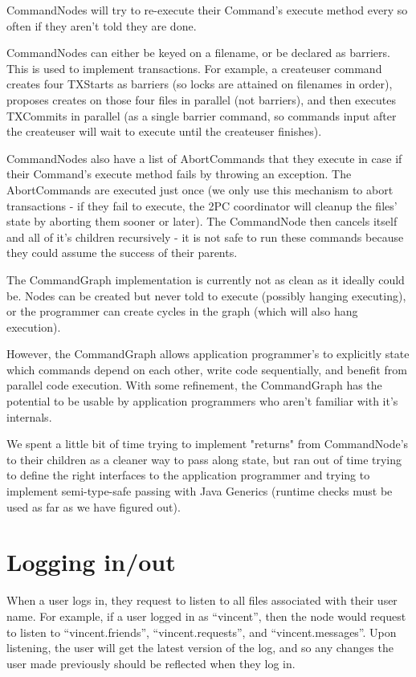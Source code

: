 \documentclass[11pt]{article}
\begin{document}
CommandNodes will try to re-execute their Command's execute method every so often if they aren't told they are done.

CommandNodes can either be keyed on a filename, or be declared as barriers. This is used to implement transactions.
For example, a createuser command creates four TXStarts as barriers (so locks are attained on filenames in order), proposes creates on those four
files in parallel (not barriers), and then executes TXCommits in parallel (as a single barrier command, so commands input after the createuser will
wait to execute until the createuser finishes).

CommandNodes also have a list of AbortCommands that they execute in case if their Command's execute method fails by throwing an exception.
The AbortCommands are executed just once (we only use this mechanism to abort transactions - if they fail to execute, the 2PC coordinator
will cleanup the files' state by aborting them sooner or later). The CommandNode then cancels itself and all of it's children recursively -
it is not safe to run these commands because they could assume the success of their parents.

The CommandGraph implementation is currently not as clean as it ideally could be. Nodes can be created but never told to execute
(possibly hanging executing), or the programmer can create cycles in the graph (which will also hang execution).

However, the CommandGraph allows application programmer's to explicitly state which commands depend on each other, write code sequentially,
and benefit from parallel code execution. With some refinement, the CommandGraph has the potential to be usable by application programmers who
aren't familiar with it's internals.

We spent a little bit of time trying to implement "returns" from CommandNode's to their children as a cleaner way to pass along state,
but ran out of time trying to define the right interfaces to the application programmer and trying to implement semi-type-safe passing
with Java Generics (runtime checks must be used as far as we have figured out).

\section{Logging in/out}

When a user logs in, they request to listen to all files associated with their user name. For example, if a user logged in as ``vincent'', then the node would request to listen to ``vincent.friends'', ``vincent.requests'', and ``vincent.messages''. Upon listening, the user will get the latest version of the log, and so any changes the user made previously should be reflected when they log in. 
\end{document}
